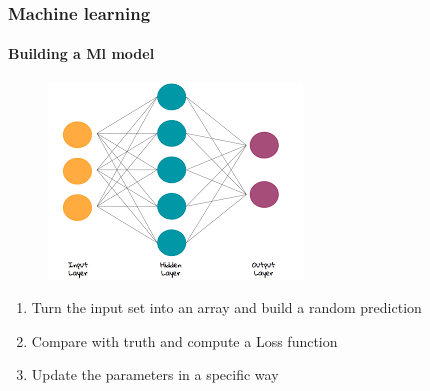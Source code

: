 \documentclass[aspectratio=43]{beamer}
\begin{document}
\begin{frame}

	\frametitle{Machine learning}
	\framesubtitle{Building a Ml model}
	
		\begin{figure}
			\includegraphics[width = 0.45\linewidth]{plots/NN.png}
		\end{figure}
		
	\begin{enumerate}
		\item Turn the input set into an array and build a {\color{red}random} prediction 
		\item Compare with truth and compute a {\color{blue}Loss} function
		\item Update the parameters in a specific way
	\end{enumerate}
	

\end{frame}
\end{document}

